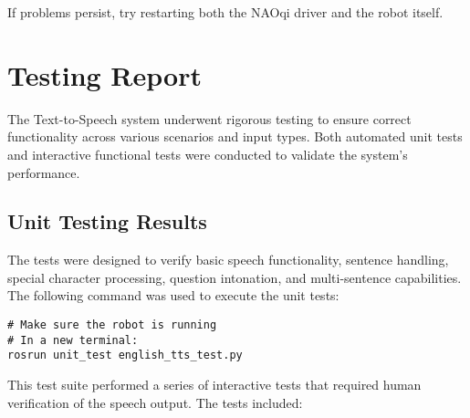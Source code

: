 \documentclass{CSSRforAfrica}
\begin{document}
If problems persist, try restarting both the NAOqi driver and the robot itself.

\newpage


\newpage
\section{Testing Report}

The Text-to-Speech system underwent rigorous testing to ensure correct functionality across various scenarios and input types. Both automated unit tests and interactive functional tests were conducted to validate the system's performance.

\subsection{Unit Testing Results}

The tests were designed to verify basic speech functionality, sentence handling, special character processing, question intonation, and multi-sentence capabilities. The following command was used to execute the unit tests:

\begin{lstlisting}[style=commandstyle]
# Make sure the robot is running
# In a new terminal:
rosrun unit_test english_tts_test.py
\end{lstlisting}


This test suite performed a series of interactive tests that required human verification of the speech output. The tests included:
\end{document}

